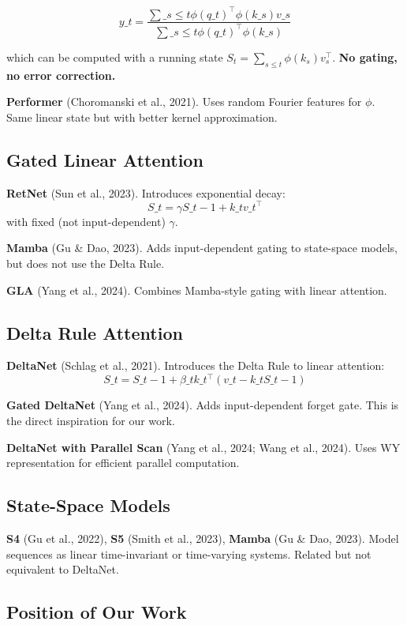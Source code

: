 \[
y\_t = \frac{\sum\_{s \leq t} \phi(q\_t)^\top \phi(k\_s) v\_s}{\sum\_{s \leq t} \phi(q\_t)^\top \phi(k\_s)}
\tag{2.1}
\]

which can be computed with a running state $S_t = \sum_{s \leq t} \phi(k_s) v_s^\top$. 
\textbf{No gating, no error correction.}

\textbf{Performer} (Choromanski et al., 2021). Uses random Fourier features for 
$\phi$. Same linear state but with better kernel approximation.

\subsection{Gated Linear Attention}

\textbf{RetNet} (Sun et al., 2023). Introduces exponential decay:
\[
S\_t = \gamma S\_{t-1} + k\_t v\_t^\top
\tag{2.2}
\]
with fixed (not input-dependent) $\gamma$.

\textbf{Mamba} (Gu \& Dao, 2023). Adds input-dependent gating to state-space models, 
but does not use the Delta Rule.

\textbf{GLA} (Yang et al., 2024). Combines Mamba-style gating with linear attention.

\subsection{Delta Rule Attention}

\textbf{DeltaNet} (Schlag et al., 2021). Introduces the Delta Rule to linear 
attention:
\[
S\_t = S\_{t-1} + \beta\_t k\_t^\top (v\_t - k\_t S\_{t-1})
\tag{2.3}
\]

\textbf{Gated DeltaNet} (Yang et al., 2024). Adds input-dependent forget gate. 
This is the direct inspiration for our work.

\textbf{DeltaNet with Parallel Scan} (Yang et al., 2024; Wang et al., 2024). Uses 
WY representation for efficient parallel computation.

\subsection{State-Space Models}

\textbf{S4} (Gu et al., 2022), \textbf{S5} (Smith et al., 2023), \textbf{Mamba} (Gu \& Dao, 
2023). Model sequences as linear time-invariant or time-varying systems. 
Related but not equivalent to DeltaNet.

\subsection{Position of Our Work}


